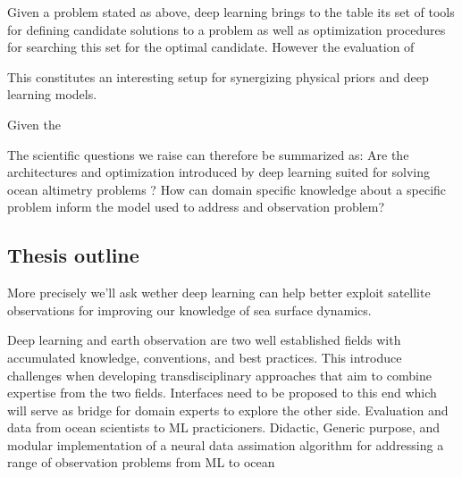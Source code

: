 \begin{bibunit}
Given a problem stated as above, deep learning brings to the table its set of tools for defining candidate solutions to a problem as well as optimization procedures for searching this set for the optimal candidate.
However the evaluation of 





This constitutes an interesting setup for synergizing physical priors and deep learning models.

Given the 


The scientific questions we raise can therefore be summarized as: Are the architectures and optimization introduced by deep learning suited for solving ocean altimetry problems ? How can domain specific knowledge about a specific problem inform the model used to address and observation problem? 




\subsection{Thesis outline}
More precisely we'll ask wether deep learning can help better exploit satellite observations for improving our knowledge of sea surface dynamics.


Deep learning and earth observation are two well established fields with accumulated knowledge, conventions, and best practices. 
This introduce challenges when developing transdisciplinary approaches that aim to combine expertise from the two fields.
Interfaces need to be proposed to this end which will serve as bridge for domain experts to explore the other side.
Evaluation and data from ocean scientists to ML practicioners. 
Didactic, Generic purpose, and modular implementation of a neural data assimation algorithm for addressing a range of observation problems from ML to ocean



\end{bibunit}

